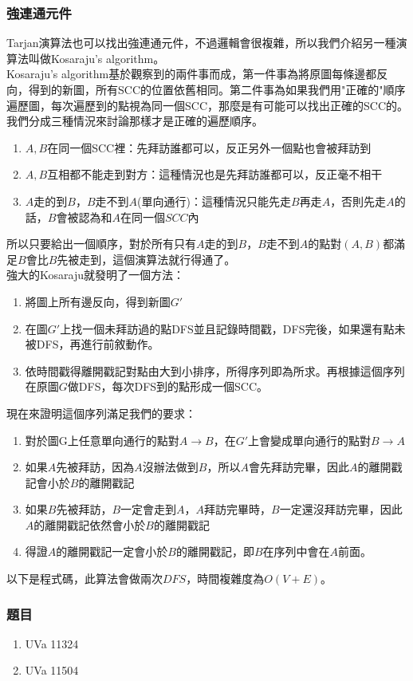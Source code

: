 \subsubsection{強連通元件}
Tarjan演算法也可以找出強連通元件，不過邏輯會很複雜，所以我們介紹另一種演算法叫做Kosaraju's algorithm。\\
Kosaraju's algorithm基於觀察到的兩件事而成，第一件事為將原圖每條邊都反向，得到的新圖，所有SCC的位置依舊相同。第二件事為如果我們用"正確的"順序遍歷圖，每次遍歷到的點視為同一個SCC，那麼是有可能可以找出正確的SCC的。\\
我們分成三種情況來討論那樣才是正確的遍歷順序。
\begin{enumerate}
\item $A,B$在同一個SCC裡：先拜訪誰都可以，反正另外一個點也會被拜訪到
\item $A,B$互相都不能走到對方：這種情況也是先拜訪誰都可以，反正毫不相干
\item $A$走的到$B$，$B$走不到$A$(單向通行)：這種情況只能先走$B$再走$A$，否則先走$A$的話，$B$會被認為和$A$在同一個$SCC$內
\end{enumerate}
所以只要給出一個順序，對於所有只有$A$走的到$B$，$B$走不到$A$的點對$(A,B)$都滿足$B$會比$B$先被走到，這個演算法就行得通了。\\
強大的Kosaraju就發明了一個方法：
\begin{enumerate}
\item 將圖上所有邊反向，得到新圖$G'$
\item 在圖$G'$上找一個未拜訪過的點DFS並且記錄時間戳，DFS完後，如果還有點未被DFS，再進行前敘動作。
\item 依時間戳得離開戳記對點由大到小排序，所得序列即為所求。再根據這個序列在原圖$G$做DFS，每次DFS到的點形成一個SCC。
\end{enumerate}
現在來證明這個序列滿足我們的要求：
\begin{enumerate}
\item 對於圖G上任意單向通行的點對$A\rightarrow B$，在$G'$上會變成單向通行的點對$B\rightarrow A$
\item 如果$A$先被拜訪，因為$A$沒辦法做到$B$，所以$A$會先拜訪完畢，因此$A$的離開戳記會小於$B$的離開戳記
\item 如果$B$先被拜訪，$B$一定會走到$A$，$A$拜訪完畢時，$B$一定還沒拜訪完畢，因此$A$的離開戳記依然會小於$B$的離開戳記
\item 得證$A$的離開戳記一定會小於$B$的離開戳記，即$B$在序列中會在$A$前面。
\end{enumerate}
以下是程式碼，此算法會做兩次$DFS$，時間複雜度為$O(V+E)$。

\subsubsection{題目}
\begin{enumerate}
\item UVa 11324
\item UVa 11504
\end{enumerate}